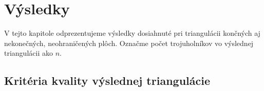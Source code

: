 
\renewcommand{\arraystretch}{1}
\setlength{\fboxsep}{3mm} %
\setlength{\tabcolsep}{5pt}

\chapter{Výsledky}
\label{kap:results}

V tejto kapitole odprezentujeme výsledky dosiahnuté pri triangulácii končných aj 
nekonečných, neohraničených plôch. Označme počet trojuholníkov vo výslednej triangulácii 
ako $n$.

\section{Kritéria kvality výslednej triangulácie}
